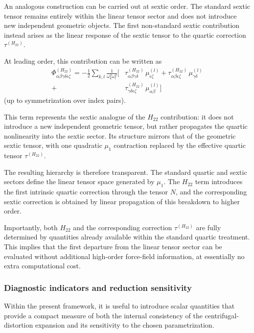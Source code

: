 \documentclass[aip,jcp,reprint,floatfix]{revtex4-2}
\begin{document}
An analogous construction can be carried out at sextic order. The
standard sextic tensor remains entirely within the linear tensor
sector and does not introduce new independent geometric objects.
The first non-standard sextic contribution instead arises as the
linear response of the sextic tensor to the quartic correction
$\tau^{(H_{22})}$.

At leading order, this contribution can be written as
\begin{equation}
\begin{aligned}
\Phi^{(H_{22})}_{\alpha\beta\gamma\delta\epsilon\zeta}
=
- \frac{1}{2}
\sum_{k,l}
\frac{1}{\omega_k^2 \omega_l^2}
\Big[
&
\tau^{(H_{22})}_{\alpha\beta\gamma\delta}
\, \mu^{(l)}_{\epsilon\zeta}
+
\tau^{(H_{22})}_{\alpha\beta\epsilon\zeta}
\, \mu^{(l)}_{\gamma\delta} \\
+
&
\tau^{(H_{22})}_{\gamma\delta\epsilon\zeta}
\, \mu^{(l)}_{\alpha\beta}
\Big]
\end{aligned}
\end{equation}
(up to symmetrization over index pairs).

This term represents the sextic analogue of the $H_{22}$ contribution:
it does not introduce a new independent geometric tensor, but rather
propagates the quartic nonlinearity into the sextic sector. Its
structure mirrors that of the geometric sextic tensor, with one
quadratic $\mu_1$ contraction replaced by the effective quartic tensor
$\tau^{(H_{22})}$.

The resulting hierarchy is therefore transparent. The standard quartic
and sextic sectors define the linear tensor space generated by
$\mu_1$. The $H_{22}$ term introduces the first intrinsic quartic
correction through the tensor $N$, and the corresponding sextic
correction is obtained by linear propagation of this breakdown to
higher order.

Importantly, both $H_{22}$ and the corresponding correction
$\tau^{(H_{22})}$ are fully determined by quantities already available
within the standard quartic treatment. This implies that the first
departure from the linear tensor sector can be evaluated without
additional high-order force-field information, at essentially no extra
computational cost.


\subsubsection{Diagnostic indicators and reduction sensitivity}

Within the present framework, it is useful to introduce scalar
quantities that provide a compact measure of both the internal
consistency of the centrifugal-distortion expansion and its
sensitivity to the chosen parametrization.
\end{document}
